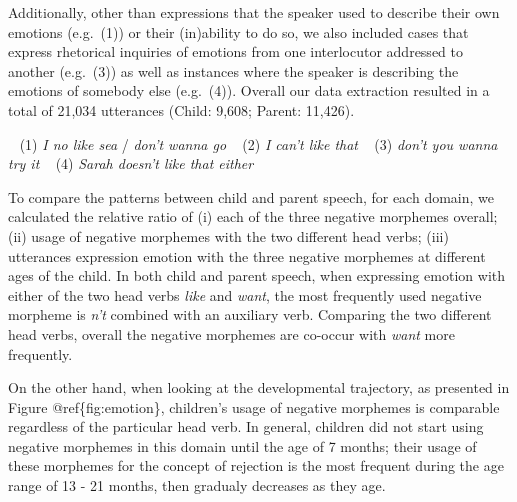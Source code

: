\documentclass[10pt, letterpaper]{article}
\begin{document}
Additionally, other than expressions that the speaker used to describe
their own emotions (e.g.~(1)) or their (in)ability to do so, we also
included cases that express rhetorical inquiries of emotions from one
interlocutor addressed to another (e.g.~(3)) as well as instances where
the speaker is describing the emotions of somebody else (e.g.~(4)).
Overall our data extraction resulted in a total of 21,034 utterances
(Child: 9,608; Parent: 11,426).

~ (1) \emph{I no like sea} / \emph{don't wanna go} ~ (2) \emph{I can't
like that} ~ (3) \emph{don't you wanna try it} ~ (4) \emph{Sarah doesn't
like that either} ~

To compare the patterns between child and parent speech, for each
domain, we calculated the relative ratio of (i) each of the three
negative morphemes overall; (ii) usage of negative morphemes with the
two different head verbs; (iii) utterances expression emotion with the
three negative morphemes at different ages of the child. In both child
and parent speech, when expressing emotion with either of the two head
verbs \emph{like} and \emph{want}, the most frequently used negative
morpheme is \emph{n't} combined with an auxiliary verb. Comparing the
two different head verbs, overall the negative morphemes are co-occur
with \emph{want} more frequently.

On the other hand, when looking at the developmental trajectory, as
presented in Figure @ref\{fig:emotion\}, children's usage of negative
morphemes is comparable regardless of the particular head verb. In
general, children did not start using negative morphemes in this domain
until the age of 7 months; their usage of these morphemes for the
concept of rejection is the most frequent during the age range of 13 -
21 months, then gradualy decreases as they age.
\end{document}
